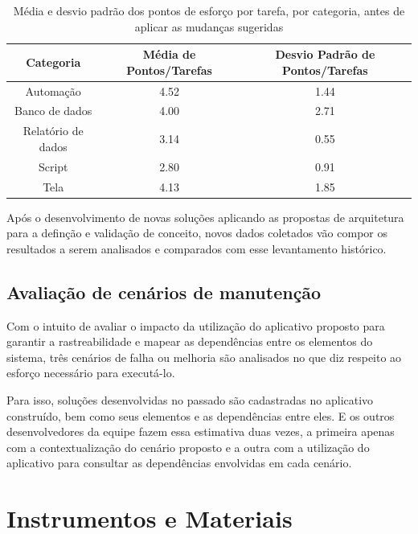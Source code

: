 	\begin{table}[!htb]
		\centering
		\begin{tabular}{ccc}
			\toprule
			\textbf{Categoria} & \textbf{Média de Pontos/Tarefas} & \textbf{Desvio Padrão de Pontos/Tarefas} \\
			\midrule
			Automação          & 4.52                             & 1.44                               \\
			Banco de dados     & 4.00                             & 2.71                               \\
			Relatório de dados & 3.14                             & 0.55                               \\
			Script             & 2.80                             & 0.91                               \\
			Tela               & 4.13                             & 1.85                               \\
			\bottomrule
		\end{tabular}
		\caption{Média e desvio padrão dos pontos de esforço por tarefa, por categoria, antes de aplicar as mudanças sugeridas}
		\label{tab:media_desvio_historico}
	\end{table}
	
	Após o desenvolvimento de novas soluções aplicando as propostas de arquitetura para a definção e validação de conceito, novos dados coletados vão compor os resultados a serem analisados e
	comparados com esse levantamento histórico.

	\subsection{Avaliação de cenários de manutenção}

	Com o intuito de avaliar o impacto da utilização do aplicativo proposto para garantir a rastreabilidade e mapear as dependências entre os elementos do sistema, três cenários de falha ou melhoria
	são analisados no que diz respeito ao esforço necessário para executá-lo.

	Para isso, soluções desenvolvidas no passado são cadastradas no aplicativo construído, bem como seus elementos e as dependências entre eles. E os outros desenvolvedores da equipe fazem essa estimativa
	duas vezes, a primeira apenas com a contextualização do cenário proposto e a outra com a utilização do aplicativo para consultar as dependências envolvidas em cada cenário.

	
	\section{Instrumentos e Materiais}

